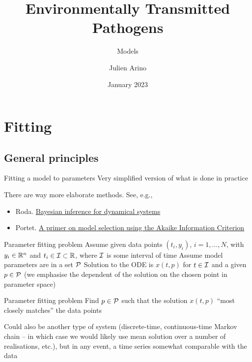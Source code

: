 \documentclass[aspectratio=169]{beamer}
\title{Environmentally Transmitted Pathogens}
\subtitle{Models}
\author{Julien Arino}
\date{January 2023}
\begin{document}

\begin{frame}
  \titlepage
\end{frame}
\addtocounter{page}{-1}



\section{Fitting}

\subsection{General principles}
\begin{frame}{Fitting a model to parameters}
Very simplified version of what is done in practice

There are way more elaborate methods. See, e.g., 
\begin{itemize}
    \item Roda. \href{https://doi.org/10.1016/j.idm.2019.12.007}{Bayesian inference for dynamical systems}
    \item Portet. \href{https://doi.org/10.1016/j.idm.2019.12.010}{A primer on model selection using the Akaike Information Criterion}
\end{itemize}
\end{frame}

\begin{frame}{Parameter fitting problem}
Assume given data points $(t_i,y_i)$, $i=1,\ldots,N$, with $y_i\in\IR^n$ and $t_i\in\I\subset\IR$, where $\I$ is some interval of time
\vfill
Assume model parameters are  in a set $\P$
\vfill
Solution to the ODE is $x(t,p)$ for $t\in\I$ and a given $p\in\P$ (we emphasise the dependent of the solution on the chosen point in parameter space)
\vfill
{
    \begin{block}{Parameter fitting problem}
        Find $p\in\P$ such that the solution $x(t,p)$ ``most closely matches'' the data points
    \end{block}    
}
\end{frame}

\begin{frame}
    Could also be another type of system (discrete-time, continuous-time Markov chain -- in which case we would likely use mean solution over a number of realisations, etc.), but in any event, a time series somewhat comparable with the data 
\end{frame}
\end{document}
